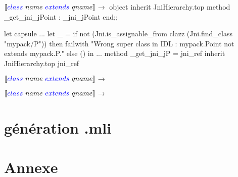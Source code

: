 \documentclass[a4paper, 11pt]{report}
\begin{document}
\noindent
$[\![{\color{blue}class}\  name\ {\color{blue}extends}\ qname ]\!]$$\longrightarrow$
%  
 object inherit JniHierarchy.top method _get_jni_jPoint : _jni_jPoint
 end;;


let capsule ...
   let _ =
      if not (Jni.is_assignable_from clazz (Jni.find_class "mypack/P"))
      then
        failwith
          "Wrong super class in IDL : mypack.Point not extends
        mypack.P."       
      else ()
    in
...
   method _get_jni_jP = jni_ref
             inherit JniHierarchy.top jni_ref


\noindent
$[\![{\color{blue}class}\  name\ {\color{blue}extends}\ qname ]\!]$$\longrightarrow$
% 

\noindent
$[\![{\color{blue}class}\  name\ {\color{blue}extends}\ qname ]\!]$$\longrightarrow$
% 


\section{génération .mli}
 














\newpage
\section*{Annexe}
\end{document}
